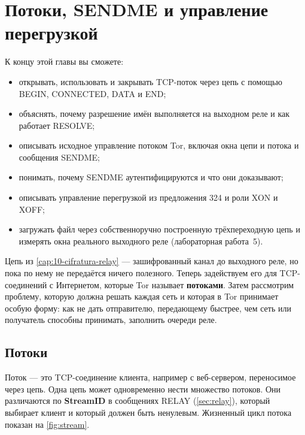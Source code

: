 \chapter{Потоки, SENDME и управление перегрузкой}\label{cap:11-stream}

\begin{obiettivi}
К концу этой главы вы сможете:
\begin{itemize}[nosep]
  \item открывать, использовать и закрывать TCP-поток через цепь с помощью BEGIN, CONNECTED, DATA и END;
  \item объяснять, почему разрешение имён выполняется на выходном реле и как работает RESOLVE;
  \item описывать исходное управление потоком Tor, включая окна цепи и потока и сообщения SENDME;
  \item понимать, почему SENDME аутентифицируются и что они доказывают;
  \item описывать управление перегрузкой из предложения 324 и роли XON и XOFF;
  \item загружать файл через собственноручно построенную трёхпереходную цепь и измерять окна реального выходного реле (лабораторная работа~5).
\end{itemize}
\end{obiettivi}

Цепь из \cref{cap:10-cifratura-relay} --- зашифрованный канал до выходного реле, но пока по нему не передаётся ничего полезного. Теперь задействуем его для TCP-соединений с Интернетом, которые Tor называет \textbf{потоками}. Затем рассмотрим проблему, которую должна решать каждая сеть и которая в Tor принимает особую форму: как не дать отправителю, передающему быстрее, чем сеть или получатель способны принимать, заполнить очереди реле.

\section{Потоки}\label{sec:stream}

Поток --- это TCP-соединение клиента, например с веб-сервером, переносимое через цепь. Одна цепь может одновременно нести множество потоков. Они различаются по \textbf{StreamID} в сообщениях RELAY (\cref{sec:relay}), который выбирает клиент и который должен быть ненулевым. Жизненный цикл потока показан на \cref{fig:stream}.

